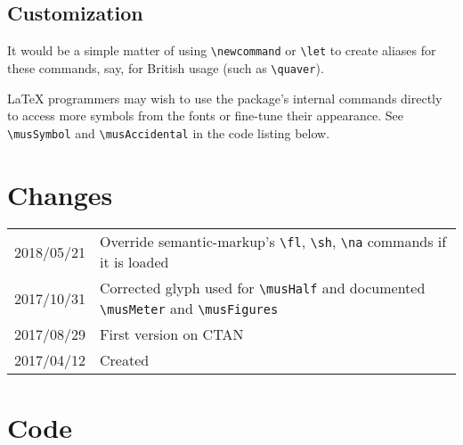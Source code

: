 \documentclass{article}
\begin{document}
\subsection{Customization}

It would be a simple matter of using \verb|\newcommand| or \verb|\let| to create
aliases for these commands, say, for British usage (such as \verb|\quaver|).

\LaTeX{} programmers may wish to use the package's internal commands directly to
access more symbols from the fonts or fine-tune their appearance.
See \verb|\musSymbol| and \verb|\musAccidental| in the code listing below. 

\section{Changes}

\begin{tabular}{r p{}}
    2018/05/21 & Override semantic-markup's \verb|\fl|, \verb|\sh|, \verb|\na|
    commands if it is loaded \\
    2017/10/31 & Corrected glyph used for \verb|\musHalf| and documented
    \verb|\musMeter| and \verb|\musFigures|\\
    2017/08/29 & First version on CTAN\\
    2017/04/12 & Created\\
\end{tabular}

\section{Code}

\end{document}
